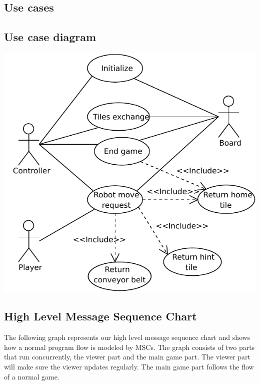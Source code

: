 \subsection{Use cases}
	
\subsection{Use case diagram}
	\includegraphics[width=\linewidth]{usecases/diagram.pdf}	

\subsection{High Level Message Sequence Chart}
	The following graph represents our high level message sequence chart and shows how a normal program flow is modeled by MSCs. The graph consists of two parts that run concurrently, the viewer part and the main game part. The viewer part will make sure the viewer updates regularly. The main game part follows the flow of a normal game. 
	

